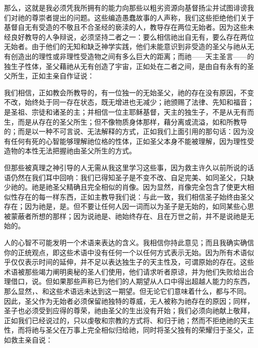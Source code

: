 那么，这就是我必须凭我所拥有的能力向那些以粗劣资源向基督扬尘并试图诽谤我们对祂的尊崇者提出的问题。这些编造愚蠢故事的人声称，我们这些拒绝他们关于基督自无有受造的不敬且不合圣经的亵渎的人，教导存在两位无始者。因为这些未经良好教导的人争辩说，必须坚持二者之一：要么相信祂出自无有，要么存在两位无始者。由于他们的无知和缺乏神学实践，他们未能意识到非受造的圣父与祂从无有创造出的理性或非理性受造物之间有多么巨大的距离；而祂——天主圣言——的独生子性体，圣父藉祂从无有创造了宇宙，正如处在二者之间，是由自有永有的圣父所生，正如主亲自作证说：\par

我们相信，正如教会所教导的，有一位独一的无始圣父，祂的存在没有原因，不变不改，始终处于同一存在状态，既无增进也无减少；祂颁赐了法律、先知和福音；是圣祖、宗徒和诸圣的主；并相信一位主耶稣基督，天主的独生子，不是从无有而生，而是从存在的圣父所生；但不像物质身体那样，藉分离或流溢，如和所教导的；而是以一种不可言说、无法解释的方式，正如我们上面引用的那句话：因为没有任何有死的心智能够理解祂位格的性体，正如圣父本身不能被理解，因为理性受造物的本性无法把握祂由圣父所生的方式。\par

但那些被真理之神引导的人无需从我这里学习这些事，因为救主许久以前所说的话语仍然在我们耳中回响：我们已得知圣子是不变不改、自足完美、如同圣父，只缺少祂的。祂是祂圣父精确且完全相似的肖像。因为显然，肖像完全包含了使更大相似性存在的每一样东西，正如主教导我们说：与此一致，我们相信圣子始终由圣父存在；因为祂是，是。但不要让任何人因一词而以为圣子是无始的，如同某些心思被蒙蔽者所想的那样；因为说祂是、祂始终存在、且在万世之前，并不是说祂是无始的。\par

人的心智不可能发明一个术语来表达的含义。我相信你持此意见；而且我确实确信你的正统观点，即这些术语中没有任何一个以任何方式表示无始。因为所有术语似乎仅仅表示时间的延伸，并不足以表达独生子的天主性及，可谓原始的存在。这些术语被那些竭力阐明奥秘的圣人们使用，他们请求听者原谅，并为他们失败给出合理借口，说。但如果那些声称已为他们的人期望从人口中得出超越人能力的东西，那么显然，、和这些术语远未达到这一期望。但无论它们意味着什么，都与不同。因此，圣父作为无始者必须保留祂独特的尊威，无人被称为祂存在的原因；同样，圣子也必须受到应得的尊荣，祂由圣父的生出没有开始；我们必须向祂献上敬拜，正如我们已经说过的，只以虔敬和宗教的方式将、和归于祂；然而不拒绝祂的天主性，而将祂与圣父在万事上完全相似归给祂，同时将圣父独有的荣耀归于圣父，正如救主亲自说：\par

